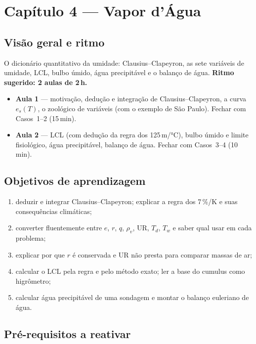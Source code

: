 \section{Capítulo 4 --- Vapor d'Água}

\subsection*{Visão geral e ritmo}

O dicionário quantitativo da umidade: Clausius--Clapeyron, as sete
variáveis de umidade, LCL, bulbo úmido, água precipitável e o balanço de
água. \textbf{Ritmo sugerido: 2 aulas de 2\,h.}

\begin{itemize}
  \item \textbf{Aula 1} — motivação, dedução e integração de
        Clausius--Clapeyron, a curva $e_s(T)$, o zoológico de variáveis
        (com o exemplo de São Paulo). Fechar com Casos~1--2 (15\,min).
  \item \textbf{Aula 2} — LCL (com dedução da regra dos 125\,m/°C), bulbo
        úmido e limite fisiológico, água precipitável, balanço de água.
        Fechar com Casos~3--4 (10\,min).
\end{itemize}

\subsection*{Objetivos de aprendizagem}

\begin{enumerate}
  \item deduzir e integrar Clausius--Clapeyron; explicar a regra dos
        7\,\%/K e suas consequências climáticas;
  \item converter fluentemente entre $e$, $r$, $q$, $\rho_v$, UR, $T_d$,
        $T_w$ e saber qual usar em cada problema;
  \item explicar por que $r$ é conservada e UR não presta para comparar
        massas de ar;
  \item calcular o LCL pela regra e pelo método exato; ler a base do
        cumulus como higrômetro;
  \item calcular água precipitável de uma sondagem e montar o balanço
        euleriano de água.
\end{enumerate}

\subsection*{Pré-requisitos a reativar}

